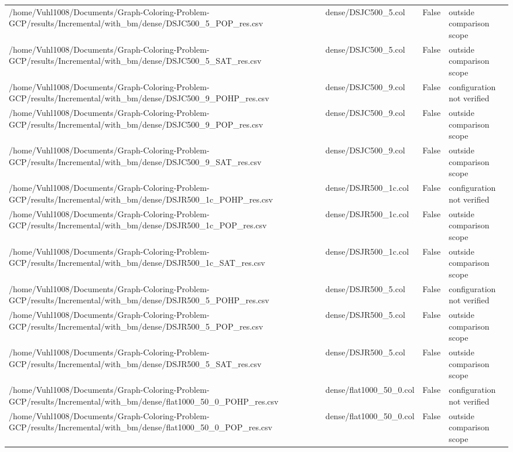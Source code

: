 \begin{table}[htbp]
\begin{tabular}{llll}
/home/Vuhl1008/Documents/Graph-Coloring-Problem-GCP/results/Incremental/with\_bm/dense/DSJC500\_5\_POP\_res.csv & dense/DSJC500\_5.col & False & outside comparison scope \\
/home/Vuhl1008/Documents/Graph-Coloring-Problem-GCP/results/Incremental/with\_bm/dense/DSJC500\_5\_SAT\_res.csv & dense/DSJC500\_5.col & False & outside comparison scope \\
/home/Vuhl1008/Documents/Graph-Coloring-Problem-GCP/results/Incremental/with\_bm/dense/DSJC500\_9\_POHP\_res.csv & dense/DSJC500\_9.col & False & configuration not verified \\
/home/Vuhl1008/Documents/Graph-Coloring-Problem-GCP/results/Incremental/with\_bm/dense/DSJC500\_9\_POP\_res.csv & dense/DSJC500\_9.col & False & outside comparison scope \\
/home/Vuhl1008/Documents/Graph-Coloring-Problem-GCP/results/Incremental/with\_bm/dense/DSJC500\_9\_SAT\_res.csv & dense/DSJC500\_9.col & False & outside comparison scope \\
/home/Vuhl1008/Documents/Graph-Coloring-Problem-GCP/results/Incremental/with\_bm/dense/DSJR500\_1c\_POHP\_res.csv & dense/DSJR500\_1c.col & False & configuration not verified \\
/home/Vuhl1008/Documents/Graph-Coloring-Problem-GCP/results/Incremental/with\_bm/dense/DSJR500\_1c\_POP\_res.csv & dense/DSJR500\_1c.col & False & outside comparison scope \\
/home/Vuhl1008/Documents/Graph-Coloring-Problem-GCP/results/Incremental/with\_bm/dense/DSJR500\_1c\_SAT\_res.csv & dense/DSJR500\_1c.col & False & outside comparison scope \\
/home/Vuhl1008/Documents/Graph-Coloring-Problem-GCP/results/Incremental/with\_bm/dense/DSJR500\_5\_POHP\_res.csv & dense/DSJR500\_5.col & False & configuration not verified \\
/home/Vuhl1008/Documents/Graph-Coloring-Problem-GCP/results/Incremental/with\_bm/dense/DSJR500\_5\_POP\_res.csv & dense/DSJR500\_5.col & False & outside comparison scope \\
/home/Vuhl1008/Documents/Graph-Coloring-Problem-GCP/results/Incremental/with\_bm/dense/DSJR500\_5\_SAT\_res.csv & dense/DSJR500\_5.col & False & outside comparison scope \\
/home/Vuhl1008/Documents/Graph-Coloring-Problem-GCP/results/Incremental/with\_bm/dense/flat1000\_50\_0\_POHP\_res.csv & dense/flat1000\_50\_0.col & False & configuration not verified \\
/home/Vuhl1008/Documents/Graph-Coloring-Problem-GCP/results/Incremental/with\_bm/dense/flat1000\_50\_0\_POP\_res.csv & dense/flat1000\_50\_0.col & False & outside comparison scope \\

\end{tabular}
\end{table}
